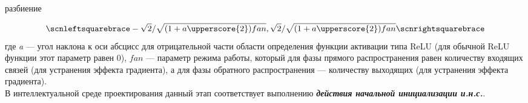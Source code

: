 \begin{SCn}
\begin{scnsubstruct}
\begin{scnsubstruct}
\begin{scnindent}
\begin{scnrelfromset}{разбиение}
\begin{scnindent}
{				\begin{equation*}
					\scnleftsquarebrace -\sqrt{2} / \sqrt{(1+a\upperscore{2})fan}, \sqrt{2} / \sqrt{(1+a\upperscore{2})fan}\scnrightsquarebrace
				\end{equation*}
				где \textit{a} --- угол наклона к оси абсцисс для отрицательной части области определения функции активации типа ReLU (для обычной ReLU функции этот параметр равен 0), $fan$ --- параметр режима работы, который для фазы прямого распространения равен количеству входящих связей (для устранения эффекта  градиента), а для фазы обратного распространения --- количеству выходящих (для устранения эффекта  градиента).
				\\В интеллектуальной среде проектирования данный этап соответствует выполнению \textbf{\textit{действия начальной инициализации и.н.с.}}.}
		\end{scnindent}
	\end{scnrelfromset}
\end{scnindent}


\end{scnsubstruct}
\end{scnsubstruct}
\end{SCn}
